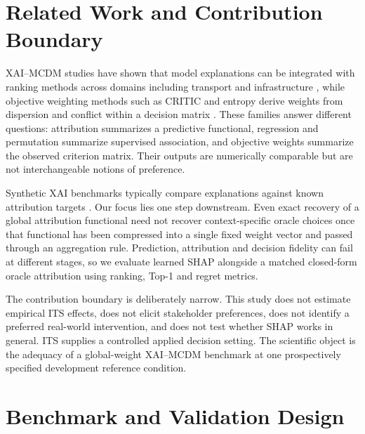 \documentclass[runningheads,orivec]{llncs}
\newcommand{\CRITIC}{CRITIC}
\begin{document}
\section{Related Work and Contribution Boundary}
\label{sec:related}

XAI--MCDM studies have shown that model explanations can be integrated with ranking
methods across domains including transport and infrastructure
\cite{ciano2025xaimcdm,demir2025shapmultimoora,zakeri2024mlmcdm}, while objective
weighting methods such as \CRITIC{} and entropy derive weights from dispersion and
conflict within a decision matrix
\cite{diakoulaki1995critic,shannon1948,mukhametzyanov2021objective}. These families
answer different questions: attribution summarizes a predictive functional, regression
and permutation summarize supervised association, and objective weights summarize the
observed criterion matrix. Their outputs are numerically comparable but are not
interchangeable notions of preference.

Synthetic XAI benchmarks typically compare explanations against known attribution
targets \cite{liu2021xaibench,agarwal2022openxai}. Our focus lies one step downstream.
Even exact recovery of a global attribution functional need not recover
context-specific oracle choices once that functional has been compressed into a single
fixed weight vector and passed through an aggregation rule. Prediction, attribution and
decision fidelity can fail at different stages, so we evaluate learned SHAP alongside a
matched closed-form oracle attribution using ranking, Top-1 and regret metrics.

The contribution boundary is deliberately narrow. This study does not estimate
empirical ITS effects, does not elicit stakeholder preferences, does not identify a
preferred real-world intervention, and does not test whether SHAP works in general. ITS
supplies a controlled applied decision setting. The scientific object is the adequacy
of a global-weight XAI--MCDM benchmark at one prospectively specified development
reference condition.

\section{Benchmark and Validation Design}
\label{sec:methods}
\end{document}
